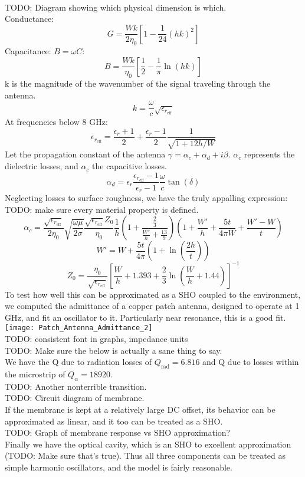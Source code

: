 \documentclass[final]{article}
\begin{document}
\\
TODO: Diagram showing which physical dimension is which.\\
Conductance:
\[G=\frac{Wk}{2\eta_0} \left[1-\frac{1}{24}\left(hk\right)^2\right]\]
Capacitance: \(B=\omega C\):
\[B=\frac{Wk}{\eta_0} \left[\frac{1}{2}-\frac{1}{\pi} \ln\left(hk\right)\right]\]
k is the magnitude of the wavenumber of the signal traveling through the antenna.
\[k=\frac{\omega}{c}\sqrt{\epsilon_{r_\text{eff}}}\]
At frequencies below 8 GHz:
\[\epsilon_{r_{\text{eff}}}=\frac{\epsilon_r+1}{2}+\frac{\epsilon_r-1}{2}\frac{1}{\sqrt{1+12h/W}}\]
Let the propagation constant of the antenna \(\gamma=\alpha_c+\alpha_d+i\beta\). \(\alpha_c\) represents the dielectric losses, and \(\alpha_c\) the capacitive losses.
\[\alpha_d= \epsilon_r \frac{\epsilon_{r_{\text{eff}}}-1}{\epsilon_r-1} \frac{\omega}{c} \tan(\delta)\]
Neglecting losses to surface roughness, we have the truly appalling expression:\\
TODO: make sure every material property is defined.
\[\alpha_c=\frac{\sqrt{\epsilon_{r_{\text{eff}}}}}{2\eta_0} \sqrt{\frac{\omega \mu}{2\sigma}} \frac{\sqrt{\epsilon_{r_{\text{eff}}}} Z_0}{\eta_0} \frac{1}{h}\left(1+\frac{\frac{2}{3}}{\frac{W'}{h}+\frac{13}{9}}\right)
\left(1+\frac{W'}{h}+\frac{5t}{4\pi W}+\frac{W'-W}{t}\right)\]
\[W'=W+\frac{5t}{4\pi}\left(1+\ln\left(\frac{2h}{t}\right)\right)\]
\[Z_0=\frac{\eta_0}{\sqrt{\epsilon_{r_{\text{eff}}}}}\left[\frac{W}{h}+1.393+\frac{2}{3}\ln\left(\frac{W}{h}+1.44\right)\right]^{-1}\]
To test how well this can be approximated as a SHO coupled to the environment, we computed the admittance of a copper patch antenna, designed to operate at 1 GHz, and fit an oscillator to it. Particularly near resonance, this is a good fit.\\
\texttt{[image: Patch\_Antenna\_Admittance\_2]}\\
TODO: consistent font in graphs, impedance units\\
TODO: Make sure the below is actually a sane thing to say.\\
We have the Q due to radiation losses of \(Q_{\text{rad}}=6.816\) and Q due to losses within the microstrip of \(Q_{\alpha}=18920\).\\
TODO: Another nonterrible transition.\\
TODO: Circuit diagram of membrane.\\
If the membrane is kept at a relatively large DC offset, its behavior can be approximated as linear, and it too can be treated as a SHO.\\
TODO: Graph of membrane response vs SHO approximation?\\
Finally we have the optical cavity, which is an SHO to excellent approximation (TODO: Make sure that's true). Thus all three components can be treated as simple harmonic oscillators, and the model is fairly reasonable.
\end{document}
